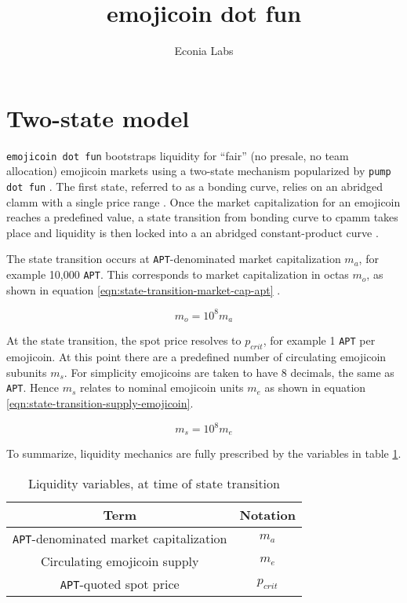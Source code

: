\documentclass[table, twocolumn]{article}
\title{emojicoin dot fun}
\author{Econia Labs}
\date{}
\begin{document}
\maketitle

\section{Two-state model}

\texttt{emojicoin dot fun} bootstraps liquidity for ``fair'' (no presale, no team
allocation) emojicoin markets using a two-state mechanism popularized by \texttt{pump
dot fun} \cite{pump}. The first state, referred to as a bonding curve, relies on an
abridged \gls*{clamm} with a single price range \cite{univ3}. Once the market
capitalization for an emojicoin reaches a predefined value, a state transition from
bonding curve to \gls*{cpamm} takes place and liquidity is then locked into a
an abridged constant-product curve \cite{univ2}.

The state transition occurs at \texttt{APT}-denominated market capitalization $m_a$, for
example 10,000 \texttt{APT}. This corresponds to market capitalization in octas $m_o$,
as shown in equation \ref{eqn:state-transition-market-cap-apt} \cite{octas}.

\begin{equation} \label{eqn:state-transition-market-cap-apt}
  m_o = 10^8 m_a
\end{equation}

At the state transition, the spot price resolves to $p_{crit}$, for example 1
\texttt{APT} per emojicoin. At this point there are a predefined number of circulating
emojicoin subunits $m_s$. For simplicity emojicoins are taken to have 8 decimals, the
same as \texttt{APT}. Hence $m_s$ relates to nominal emojicoin units $m_e$ as shown
in equation \ref{eqn:state-transition-supply-emojicoin}.

\begin{equation} \label{eqn:state-transition-supply-emojicoin}
  m_s = 10^8 m_e
\end{equation}

To summarize, liquidity mechanics are fully prescribed by the variables in table
\ref{tab:state-model-variables}.

\begin{table}[!htb]
  \centering
  \begin{tabular}{|c|c|}
    \hline \rowcolor{blue}
    Term                                           & Notation   \\ \hline
    \texttt{APT}-denominated market capitalization & $m_a$      \\ \hline
    Circulating emojicoin supply                   & $m_e$      \\ \hline
    \texttt{APT}-quoted spot price                 & $p_{crit}$ \\ \hline
  \end{tabular}
  \caption{Liquidity variables, at time of state transition}
  \label{tab:state-model-variables}
\end{table}
\end{document}
